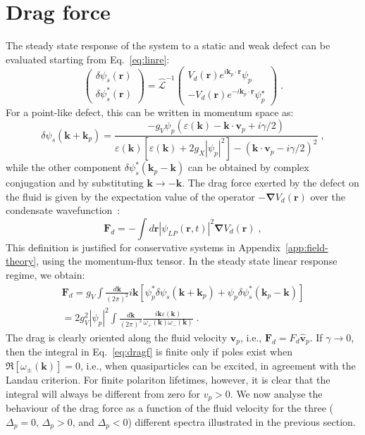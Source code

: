 \section{Drag force}
\label{sec:drag}
%
The steady state response of the system to a static and weak defect
can be evaluated starting from Eq.~\eqref{eq:linre}:
%
\begin{equation*}
  \begin{pmatrix} \delta \psi_s(\bm{r}) \\ \delta
    \psi_s^*(\bm{r}) \end{pmatrix} =
  \hat{\mathcal{L}}^{-1} \begin{pmatrix} V_d(\bm{r}) e^{i \bm{k}_p
      \cdot \bm{r}} \psi_p \\ -V_d(\bm{r}) e^{-i \bm{k}_p \cdot
      \bm{r}} \psi_p^{\star} \end{pmatrix} \; .
\end{equation*}
%
For a point-like defect, this can be written in momentum space as:
%
\begin{equation*}
  \delta \psi_s (\bm{k} + \bm{k}_p) = \frac{-g_V \psi_p
    (\varepsilon(\bm{k}) - \bm{k} \cdot \bm{v}_p +
    i\gamma/2)}{\varepsilon(\bm{k}) [\varepsilon(\bm{k}) +
      2g_X|\psi_p|^2] - (\bm{k} \cdot \bm{v}_p - i\gamma/2)^2} \; ,
\end{equation*}
%
while the other component $\delta \psi_s^* (\bm{k}_p - \bm{k})$ can be
obtained by complex conjugation and by substituting
$\bm{k} \rightarrow -\bm{k}$. The drag force exerted by the defect on the
fluid is given by the expectation value of the operator
$-\bm{\nabla}V_d(\bm{r})$ over the condensate
wavefunction~\cite{Pavloff2002}:
%
\begin{equation}
  \bm{F}_d = - \int d\bm{r} |\psi_{LP}(\bm{r},t)|^2 \bm{\nabla}V_d(\bm{r}) \; ,
\end{equation}
%
This definition is justified for conservative systems in
Appendix~\ref{app:field-theory}, using the momentum-flux tensor. In
the steady state linear response regime, we obtain:
%
\begin{multline}
  \bm{F}_d = g_V \int \frac{d\bm{k}}{(2\pi)^2} i\bm{k}
  \left[\psi_p^* \delta\psi_s (\bm{k} + \bm{k}_p) + \psi_p \delta
    \psi_s^* (\bm{k}_p - \bm{k})\right]\\
%
  = 2g_V^2|\psi_p|^2 \int \frac{d\bm{k}}{(2\pi)^2} \frac{i\bm{k}
    \varepsilon(\bm{k})}{\omega_{+} (\bm{k})\omega_{-} (\bm{k})}
  \; .
    \label{eq:dragf}
\end{multline}
%
The drag is clearly oriented along the fluid velocity $\bm{v}_p$,
i.e., $\bm{F}_d = F_d \hat{\bm{v}}_p$. If $\gamma \to 0$, then the
integral in Eq.~\eqref{eq:dragf} is finite only if poles exist when
$\Re [\omega_{\pm} (\bm{k})] = 0$, i.e., when quasiparticles can be
excited, in agreement with the Landau criterion. For finite polariton
lifetimes, however, it is clear that the integral will always be
different from zero for $v_p>0$.
We now analyse the behaviour of the drag force as a function of the
fluid velocity for the three ($\Delta_p = 0$, $\Delta_p > 0$, and
$\Delta_p < 0$) different spectra illustrated in the previous section.

